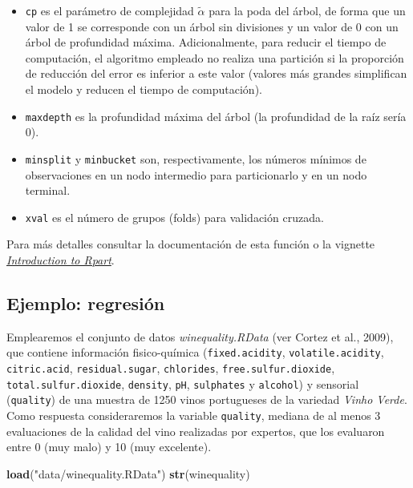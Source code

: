 \documentclass[]{book}
\newenvironment{Shaded}{\begin{snugshade}}{\end{snugshade}}
\newcommand{\KeywordTok}[1]{\textcolor[rgb]{0.13,0.29,0.53}{\textbf{#1}}}
\newcommand{\StringTok}[1]{\textcolor[rgb]{0.31,0.60,0.02}{#1}}
\newcommand{\NormalTok}[1]{#1}
\theoremstyle{break}
\theoremstyle{definition}
\theoremstyle{definition}
\theoremstyle{definition}
\theoremstyle{remark}
\begin{document}
\begin{itemize}
  \begin{itemize}
  \item
    \texttt{cp} es el parámetro de complejidad \(\tilde \alpha\) para la
    poda del árbol, de forma que un valor de 1 se corresponde con un
    árbol sin divisiones y un valor de 0 con un árbol de profundidad
    máxima. Adicionalmente, para reducir el tiempo de computación, el
    algoritmo empleado no realiza una partición si la proporción de
    reducción del error es inferior a este valor (valores más grandes
    simplifican el modelo y reducen el tiempo de computación).
  \item
    \texttt{maxdepth} es la profundidad máxima del árbol (la profundidad
    de la raíz sería 0).
  \item
    \texttt{minsplit} y \texttt{minbucket} son, respectivamente, los
    números mínimos de observaciones en un nodo intermedio para
    particionarlo y en un nodo terminal.
  \item
    \texttt{xval} es el número de grupos (folds) para validación
    cruzada.
  \end{itemize}
\end{itemize}

Para más detalles consultar la documentación de esta función o la
vignette
\href{https://cran.r-project.org/web/packages/rpart/vignettes/longintro.pdf}{\emph{Introduction
to Rpart}}.

\subsection{Ejemplo: regresión}\label{ejemplo-regresiuxf3n}

Emplearemos el conjunto de datos \emph{winequality.RData} (ver Cortez et
al., 2009), que contiene información fisico-química
(\texttt{fixed.acidity}, \texttt{volatile.acidity},
\texttt{citric.acid}, \texttt{residual.sugar}, \texttt{chlorides},
\texttt{free.sulfur.dioxide}, \texttt{total.sulfur.dioxide},
\texttt{density}, \texttt{pH}, \texttt{sulphates} y \texttt{alcohol}) y
sensorial (\texttt{quality}) de una muestra de 1250 vinos portugueses de
la variedad \emph{Vinho Verde}. Como respuesta consideraremos la
variable \texttt{quality}, mediana de al menos 3 evaluaciones de la
calidad del vino realizadas por expertos, que los evaluaron entre 0 (muy
malo) y 10 (muy excelente).

\begin{Shaded}
\begin{Highlighting}[]
\KeywordTok{load}\NormalTok{(}\StringTok{"data/winequality.RData"}\NormalTok{)}
\KeywordTok{str}\NormalTok{(winequality)}
\end{Highlighting}
\end{Shaded}
\end{document}

